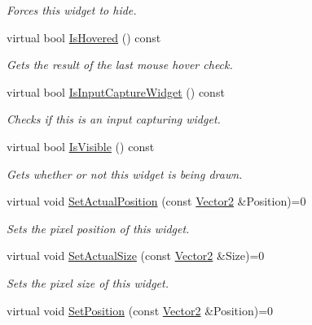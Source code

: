 \begin{DoxyCompactItemize}
\begin{DoxyCompactList}\small\item\em Forces this widget to hide. \item\end{DoxyCompactList}\item 
virtual bool \hyperlink{classMezzanine_1_1UI_1_1Widget_aacf72f1145b139804f40d02fcac4ee93}{IsHovered} () const 
\begin{DoxyCompactList}\small\item\em Gets the result of the last mouse hover check. \item\end{DoxyCompactList}\item 
virtual bool \hyperlink{classMezzanine_1_1UI_1_1Widget_ad18ddb91597bc835d6a3678a2fbcd45d}{IsInputCaptureWidget} () const 
\begin{DoxyCompactList}\small\item\em Checks if this is an input capturing widget. \item\end{DoxyCompactList}\item 
virtual bool \hyperlink{classMezzanine_1_1UI_1_1Widget_a543fa0c3bdee98591fcd77eb75d25258}{IsVisible} () const 
\begin{DoxyCompactList}\small\item\em Gets whether or not this widget is being drawn. \item\end{DoxyCompactList}\item 
virtual void \hyperlink{classMezzanine_1_1UI_1_1Widget_a860bd8baea24d61a9cd661e85831f981}{SetActualPosition} (const \hyperlink{classMezzanine_1_1Vector2}{Vector2} \&Position)=0
\begin{DoxyCompactList}\small\item\em Sets the pixel position of this widget. \item\end{DoxyCompactList}\item 
virtual void \hyperlink{classMezzanine_1_1UI_1_1Widget_acc8a472036872bbbfd0476f753c80ba4}{SetActualSize} (const \hyperlink{classMezzanine_1_1Vector2}{Vector2} \&Size)=0
\begin{DoxyCompactList}\small\item\em Sets the pixel size of this widget. \item\end{DoxyCompactList}\item 
virtual void \hyperlink{classMezzanine_1_1UI_1_1Widget_ac83b59db51a6717ad7b822007dde3576}{SetPosition} (const \hyperlink{classMezzanine_1_1Vector2}{Vector2} \&Position)=0

\end{DoxyCompactItemize}
